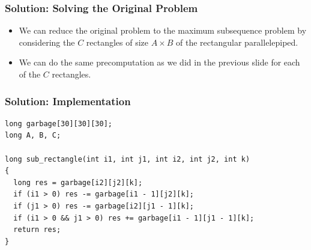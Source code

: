 \documentclass{beamer}
\begin{document}
\begin{frame}%
\frametitle{Solution: Solving the Original Problem}

\footnotesize

\begin{itemize}

\item We can reduce the original problem to the maximum subsequence problem by
considering the $C$ rectangles of size $A \times B$ of the rectangular parallelepiped.

\item<2-> We can do the same precomputation as we did in the previous slide for each of the $C$ rectangles.


\end{itemize}

\end{frame}

\begin{frame}[containsverbatim]
\frametitle{Solution: Implementation}

\scriptsize
\begin{lstlisting}
long garbage[30][30][30];
long A, B, C;

long sub_rectangle(int i1, int j1, int i2, int j2, int k)
{
  long res = garbage[i2][j2][k];
  if (i1 > 0) res -= garbage[i1 - 1][j2][k];
  if (j1 > 0) res -= garbage[i2][j1 - 1][k];
  if (i1 > 0 && j1 > 0) res += garbage[i1 - 1][j1 - 1][k];
  return res;
}
\end{lstlisting}

\end{frame}
\end{document}
